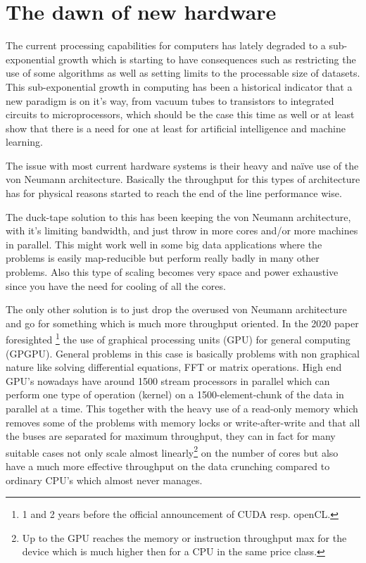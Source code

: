 \documentclass{article}
\begin{document}
\section{The dawn of new hardware}
    The current processing capabilities for computers has lately degraded to a
    sub-exponential growth which is starting to have consequences such as 
    restricting the use of some algorithms as well as setting limits 
    to the processable size of datasets.
    This sub-exponential growth in computing has been a historical indicator
    that a new paradigm is on it's way, from vacuum tubes to transistors to
    integrated circuits to microprocessors, which should be the case this time as
    well or at least show that there is a need for one at least for artificial
    intelligence and machine learning.
    
    The issue with most current hardware systems is their heavy and 
    na\"{i}ve use of the von Neumann architecture. Basically the throughput 
    for this types of architecture has for physical reasons started to reach 
    the end of the line performance wise.\cite{neweraibm}

    The duck-tape solution to this has been keeping the von Neumann
    architecture, with it's limiting bandwidth, and just throw in more cores 
    and/or more machines in parallel. This might work well in some big data 
    applications where the problems is easily map-reducible but perform really 
    badly in many other problems.\cite{mapreduce} Also this type of scaling 
    becomes very space and power exhaustive since you have the need for
    cooling of all the cores. 

    The only other solution is to just drop the overused von Neumann 
    architecture and go for something which is much more throughput oriented. 
    In the 2020 paper\cite{ms2020} foresighted \footnote{1 and 2 years before 
    the official announcement of CUDA resp. openCL.} the use of graphical 
    processing units (GPU) for general computing (GPGPU). General problems in 
    this case is basically problems with non graphical nature like
    solving differential equations, FFT or matrix operations. 
    High end GPU's nowadays have around 1500 stream processors in parallel 
    which can perform one type of operation (kernel) on a 1500-element-chunk of 
    the data in parallel at a time. This together with the heavy use 
    of a read-only memory which removes some of the problems with memory locks
    or write-after-write and that all the buses are separated for
    maximum throughput, they can in fact for many suitable cases not only scale
    almost linearly\footnote{Up to the GPU reaches the memory or instruction
    throughput max for the device which is much higher then for a CPU in the
    same price class.} on the number of cores but also have a much more 
    effective throughput on the data crunching compared to ordinary CPU's 
    which almost never manages.
\end{document}
